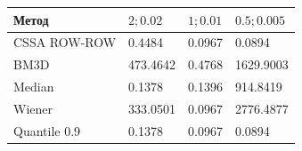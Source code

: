 \begin{tabular}{|l|l|l|l|}
\hline
Метод & $2; 0.02$ & $1; 0.01$ & $0.5; 0.005$ \\
\hline
CSSA ROW-ROW & 0.4484 & 0.0967 & 0.0894 \\
\hline
BM3D & 473.4642 & 0.4768 & 1629.9003 \\
\hline
Median & 0.1378 & 0.1396 & 914.8419 \\
\hline
Wiener & 333.0501 & 0.0967 & 2776.4877 \\
\hline
Quantile 0.9 & 0.1378 & 0.0967 & 0.0894 \\
\hline
\end{tabular}
